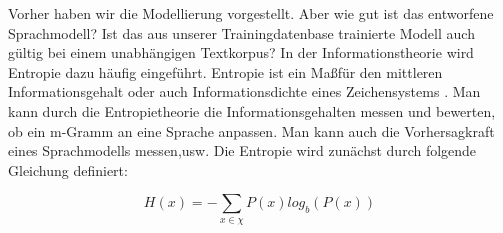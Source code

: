 Vorher haben wir die Modellierung vorgestellt. Aber wie gut ist das entworfene Sprachmodell? Ist das aus unserer Trainingdatenbase trainierte Modell auch g\"ultig bei einem unabh\"angigen Textkorpus? In der Informationstheorie wird Entropie dazu h\"aufig eingef\"uhrt.
Entropie ist ein Ma\ss f\"ur den mittleren Informationsgehalt oder auch Informationsdichte eines Zeichensystems \cite{int_entropie}. Man kann durch die Entropietheorie die Informationsgehalten messen und bewerten, ob ein m-Gramm an eine Sprache anpassen. Man kann auch die Vorhersagkraft eines Sprachmodells messen,usw.\cite{book_speech}
Die Entropie wird zun\"achst durch folgende Gleichung definiert:

\begin{equation}
\label{equation:bewertung_01}
H(x)=-\sum_{x\in\chi}P(x)log_{b}(P(x))
\end{equation}

